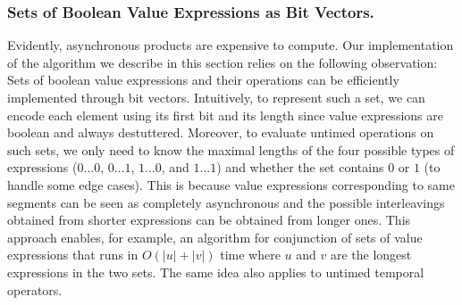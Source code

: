 






\subsubsection{Sets of Boolean Value Expressions as Bit Vectors.}
Evidently, asynchronous products are expensive to compute.
Our implementation of the algorithm we describe in this section relies on the following observation:
Sets of boolean value expressions and their operations can be efficiently implemented through bit vectors.
Intuitively, to represent such a set, we can encode each element using its first bit and its length since value expressions are boolean and always destuttered.
Moreover, to evaluate untimed operations on such sets, we only need to know the maximal lengths of the four possible types of expressions ($0 \ldots 0$, $0 \ldots 1$, $1 \ldots 0$, and $1 \ldots 1$) and whether the set contains $0$ or $1$ (to handle some edge cases).
This is because value expressions corresponding to same segments can be seen as completely asynchronous and the possible interleavings obtained from shorter expressions can be obtained from longer ones.
This approach enables, for example, an algorithm for conjunction of sets of value expressions that runs in $O(|u| + |v|)$ time where $u$ and $v$ are the longest expressions in the two sets.
The same idea also applies to untimed temporal operators.

